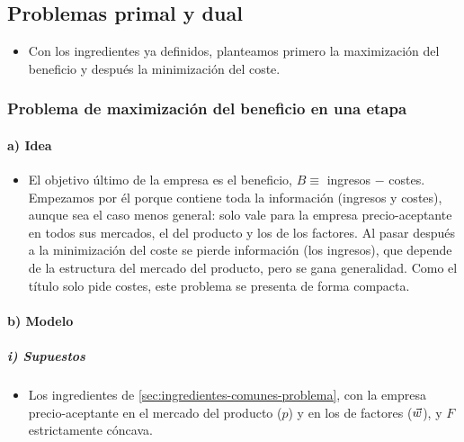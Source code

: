 \documentclass[11pt]{article}
\begin{document}
\subsection{Problemas primal y dual}\label{sec:problemas-primal-dual}

\begin{itemize}
\item Con los ingredientes ya definidos, planteamos primero la maximización del beneficio y después la minimización del coste.
\end{itemize}

\subsubsection{Problema de maximización del beneficio en una etapa}\label{sec:problema-maximizacion-beneficio}

\paragraph{a) Idea}

\begin{itemize}
\item El objetivo último de la empresa es el beneficio, $B\equiv$ ingresos $-$ costes. Empezamos por él porque contiene toda la información (ingresos y costes), aunque sea el caso menos general: solo vale para la empresa precio-aceptante en todos sus mercados, el del producto y los de los factores. Al pasar después a la minimización del coste se pierde información (los ingresos), que depende de la estructura del mercado del producto, pero se gana generalidad. Como el título solo pide costes, este problema se presenta de forma compacta.
\end{itemize}

\paragraph{b) Modelo}

\subparagraph{i) Supuestos}

\begin{itemize}
\item Los ingredientes de \ref{sec:ingredientes-comunes-problema}, con la empresa precio-aceptante en el mercado del producto ($p$) y en los de factores ($\vec{w}$), y $F$ estrictamente cóncava.
\end{itemize}
\end{document}
